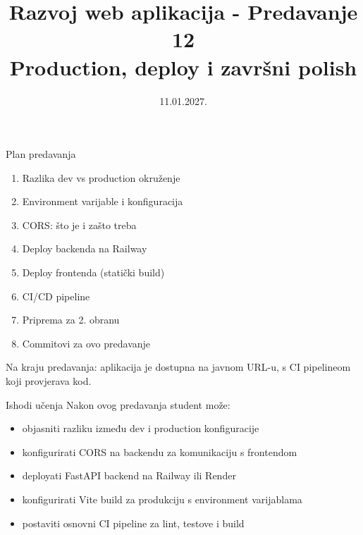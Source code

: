 

\title[Razvoj web aplikacija]{Razvoj web aplikacija - Predavanje 12 \\ Production, deploy i završni polish}
\date{11.01.2027.}



\frame{\titlepage}

\begin{frame}{Plan predavanja}
\begin{enumerate}
  \item Razlika dev vs production okruženje
  \item Environment varijable i konfiguracija
  \item CORS: što je i zašto treba
  \item Deploy backenda na Railway
  \item Deploy frontenda (statički build)
  \item CI/CD pipeline
  \item Priprema za 2. obranu
  \item Commitovi za ovo predavanje
\end{enumerate}

\vspace{0.6em}
Na kraju predavanja: aplikacija je dostupna na javnom URL-u, s CI pipelineom koji provjerava kod.
\end{frame}

\begin{frame}{Ishodi učenja}
Nakon ovog predavanja student može:
\begin{itemize}
  \item objasniti razliku između dev i production konfiguracije
  \item konfigurirati CORS na backendu za komunikaciju s frontendom
  \item deployati FastAPI backend na Railway ili Render
  \item konfigurirati Vite build za produkciju s environment varijablama
  \item postaviti osnovni CI pipeline za lint, testove i build
\end{itemize}
\end{frame}

